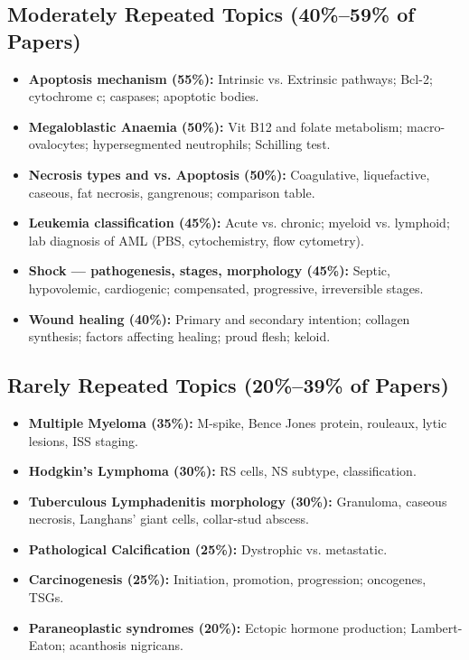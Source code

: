 \documentclass[11pt,a4paper]{article}
\begin{document}
\subsection{Moderately Repeated Topics (40\%--59\% of Papers)}
\begin{itemize}[leftmargin=*]
    \item \textbf{Apoptosis mechanism (55\%):} Intrinsic vs. Extrinsic pathways; Bcl-2; cytochrome c; caspases; apoptotic bodies.
    \item \textbf{Megaloblastic Anaemia (50\%):} Vit B12 and folate metabolism; macro-ovalocytes; hypersegmented neutrophils; Schilling test.
    \item \textbf{Necrosis types and vs. Apoptosis (50\%):} Coagulative, liquefactive, caseous, fat necrosis, gangrenous; comparison table.
    \item \textbf{Leukemia classification (45\%):} Acute vs. chronic; myeloid vs. lymphoid; lab diagnosis of AML (PBS, cytochemistry, flow cytometry).
    \item \textbf{Shock --- pathogenesis, stages, morphology (45\%):} Septic, hypovolemic, cardiogenic; compensated, progressive, irreversible stages.
    \item \textbf{Wound healing (40\%):} Primary and secondary intention; collagen synthesis; factors affecting healing; proud flesh; keloid.
\end{itemize}

\subsection{Rarely Repeated Topics (20\%--39\% of Papers)}
\begin{itemize}[leftmargin=*]
    \item \textbf{Multiple Myeloma (35\%):} M-spike, Bence Jones protein, rouleaux, lytic lesions, ISS staging.
    \item \textbf{Hodgkin's Lymphoma (30\%):} RS cells, NS subtype, classification.
    \item \textbf{Tuberculous Lymphadenitis morphology (30\%):} Granuloma, caseous necrosis, Langhans' giant cells, collar-stud abscess.
    \item \textbf{Pathological Calcification (25\%):} Dystrophic vs. metastatic.
    \item \textbf{Carcinogenesis (25\%):} Initiation, promotion, progression; oncogenes, TSGs.
    \item \textbf{Paraneoplastic syndromes (20\%):} Ectopic hormone production; Lambert-Eaton; acanthosis nigricans.
\end{itemize}
\end{document}
